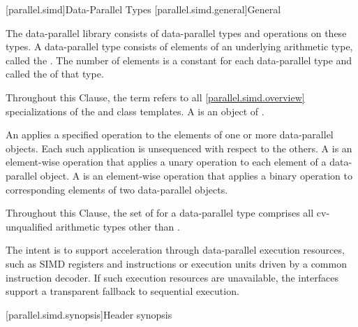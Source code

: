 
\newcommand\foralli[1][]{for all $i$ in the range of \tcode{[0, #1size())}}
\newcommand\forallmaskedi{for all selected indices $i$}

[parallel.simd]{Data-Parallel Types}
[parallel.simd.general]{General}

\pnum
The data-parallel library consists of data-parallel types and operations on these types. A data-parallel type consists of elements of an underlying arithmetic type, called the . The number of elements is a constant for each data-parallel type and called the  of that type.

\pnum
Throughout this Clause, the term  refers to all  \ref{parallel.simd.overview} specializations of the  and  class templates. A  is an object of .

\pnum
An  applies a specified operation to the elements of one or more data-parallel objects. Each such application is unsequenced with respect to the others. A  is an element-wise operation that applies a unary operation to each element of a data-parallel object. A  is an element-wise operation that applies a binary operation to corresponding elements of two data-parallel objects.

\pnum
Throughout this Clause, the set of  for a data-parallel type comprises all cv-unqualified arithmetic types other than .

\pnum
\begin{note}
The intent is to support acceleration through data-parallel execution resources, such as SIMD registers and instructions or execution units driven by a common instruction decoder. If such execution resources are unavailable, the interfaces support a transparent fallback to sequential execution.
\end{note}

[parallel.simd.synopsis]{Header  synopsis}


